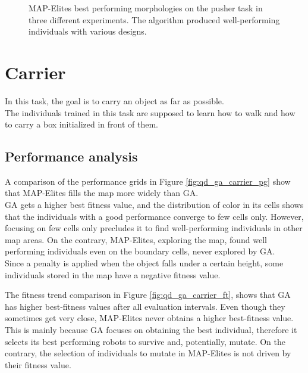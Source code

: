 \begin{figure}[H]
    \centering
    
    \caption{MAP-Elites best performing morphologies on the pusher task in three different experiments. The algorithm produced well-performing individuals with various designs.}
    \label{fig:qd_pusher_topdesigns}
\end{figure}


\section{Carrier}
In this task, the goal is to carry an object as far as possible.\\
The individuals trained in this task are supposed to learn how to walk and how to carry a box initialized in front of
them.

\subsection{Performance analysis}
A comparison of the performance grids in Figure \ref{fig:qd_ga_carrier_pg} show that MAP-Elites fills the map more widely than GA.\\
GA gets a higher best fitness value, and the distribution of color in its cells shows that the individuals with a good performance converge to few cells only. However, focusing on few cells only precludes it to find well-performing individuals in other map areas. On the contrary, MAP-Elites, exploring the map, found well performing individuals even on the boundary cells, never explored by GA.\\
Since a penalty is applied when the object falls under a certain height, some individuals stored in the map have a negative fitness value.

The fitness trend comparison in Figure \ref{fig:qd_ga_carrier_ft}, shows that GA has higher best-fitness values after all evaluation intervals. Even though they sometimes get very close, MAP-Elites never obtains a higher best-fitness value. This is mainly because GA focuses on obtaining the best individual, therefore it selects its best performing robots to survive and, potentially, mutate. On the contrary, the selection of individuals to mutate in MAP-Elites is not driven by their fitness value.

